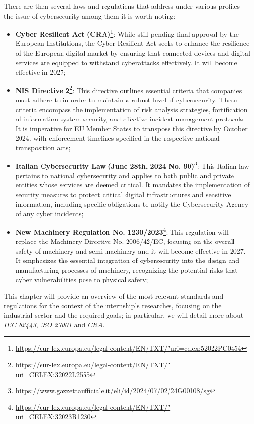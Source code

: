 There are then several laws and regulations that address under various profiles the issue of cybersecurity among them it is worth noting:~\cite{cybersecurity-standards-regulations-compliance}
\begin{itemize}
  \item \textbf{Cyber Resilient Act (CRA)}\footnote{\url{https://eur-lex.europa.eu/legal-content/EN/TXT/?uri=celex:52022PC0454}}: While still pending final approval by the European Institutions, the Cyber Resilient Act seeks to enhance the resilience of the European digital market by ensuring that connected devices and digital services are equipped to withstand cyberattacks effectively. It will become effective in 2027;
  \item  \textbf{NIS Directive 2}\footnote{\url{https://eur-lex.europa.eu/legal-content/EN/TXT/?uri=CELEX:32022L2555}}: This directive outlines essential criteria that companies must adhere to in order to maintain a robust level of cybersecurity. These criteria encompass the implementation of risk analysis strategies, fortification of information system security, and effective incident management protocols. It is imperative for EU Member States to transpose this directive by October 2024, with enforcement timelines specified in the respective national transposition acts;
  \item \textbf{Italian Cybersecurity Law (June 28th, 2024 No. 90)}\footnote{\url{https://www.gazzettaufficiale.it/eli/id/2024/07/02/24G00108/sg}}: This Italian law pertains to national cybersecurity and applies to both public and private entities whose services are deemed critical. It mandates the implementation of security measures to protect critical digital infrastructures and sensitive information, including specific obligations to notify the Cybersecurity Agency of any cyber incidents;
  \item \textbf{New Machinery Regulation No. 1230/2023}\footnote{\url{https://eur-lex.europa.eu/legal-content/EN/TXT/?uri=CELEX:32023R1230}}: This regulation will replace the Machinery Directive No. 2006/42/EC, focusing on the overall safety of machinery and semi-machinery and it will become effective in 2027. It emphasizes the essential integration of cybersecurity into the design and manufacturing processes of machinery, recognizing the potential risks that cyber vulnerabilities pose to physical safety;
\end{itemize}

This chapter will provide an overview of the most relevant standards and regulations for the context of the internship's researches, focusing on the industrial sector and the required goals; in particular, we will detail more about \textit{IEC 62443}, \textit{ISO 27001} and \textit{CRA}.


